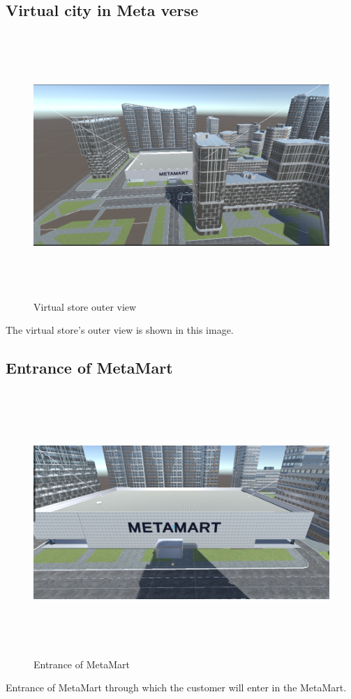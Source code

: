 \subsection{Virtual city in Meta verse}
\begin{figure}[H]
    \centering
    \includegraphics[width=12cm,height=10cm]{Figures/Environment/City.png}
    \caption{Virtual store outer view}
    \label{fig: Virtual store outer view}
\end{figure}
  The virtual store's outer view is shown in this image.
\subsection{Entrance of MetaMart}
\begin{figure}[H]
    \centering
    \includegraphics[width=12cm,height=10cm]{Figures/Environment/Entrance.png}
    \caption{Entrance of MetaMart}
    \label{fig: Entrance of MetaMart}
\end{figure}
\justifying
  Entrance of MetaMart through which the customer will enter in the MetaMart.
